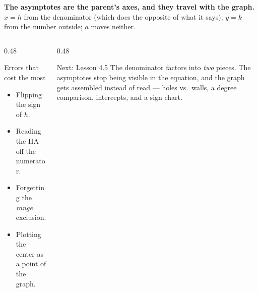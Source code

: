 \documentclass[aspectratio=169, 11pt]{beamer}
\begin{document}
\begin{frame}[t, plain]
  \begin{block}{}
    \centering\textbf{The asymptotes are the parent's axes, and they travel with the graph.} \\[3pt]
    $x=h$ from the denominator (which does the opposite of what it says); $y=k$ from the number
    outside; $a$ moves neither.
  \end{block}
  \vspace{6pt}
  \begin{columns}[T]
    \begin{column}{0.48\textwidth}
      \begin{block}{Errors that cost the most}
        \begin{itemize}\setlength{\itemsep}{2pt}
          \item Flipping the sign of $h$.
          \item Reading the HA off the numerator.
          \item Forgetting the \emph{range} exclusion.
          \item Plotting the center as a point of the graph.
        \end{itemize}
      \end{block}
    \end{column}
    \begin{column}{0.48\textwidth}
      \begin{block}{Next: Lesson 4.5}
        The denominator factors into \emph{two} pieces. The asymptotes stop being visible in the
        equation, and the graph gets assembled instead of read --- holes vs.\ walls, a degree
        comparison, intercepts, and a sign chart.
      \end{block}
    \end{column}
  \end{columns}
\end{frame}
\end{document}
